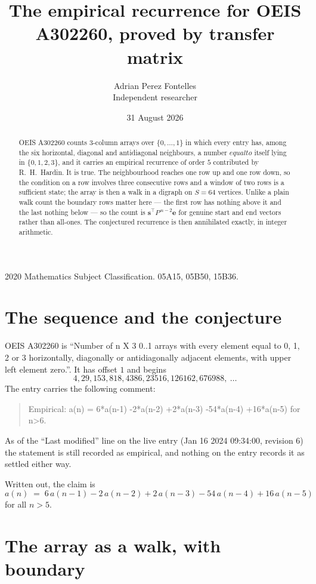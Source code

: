 \documentclass[11pt,a4paper]{article}
\title{The empirical recurrence for OEIS A302260, proved by transfer matrix}
\author{Adrian Perez Fontelles\\ \small Independent researcher}
\date{31 August 2026}
\theoremstyle{plain}
\theoremstyle{definition}
\begin{document}
\maketitle

\begin{abstract}
OEIS A302260 counts $3$-column arrays over $\{0,\dots,1\}$ in which every entry has,
among the six horizontal, diagonal and antidiagonal neighbours, a number $equal to$ itself lying in $\{0,1,2,3\}$, and it carries an empirical
recurrence of order $5$ contributed by R.~H.~Hardin. It is true. The neighbourhood
reaches one row up and one row down, so the condition on a row involves three consecutive
rows and a window of two rows is a sufficient state; the array is then a walk in a digraph
on $S=64$ vertices. Unlike a plain walk count the boundary rows matter here --- the first
row has nothing above it and the last nothing below --- so the count is
$\mathbf{s}^{\!\top}P^{\,n-2}\mathbf{e}$ for genuine start and end vectors rather than
all-ones. The conjectured recurrence is then annihilated exactly, in integer arithmetic.
\end{abstract}

\noindent\small 2020 Mathematics Subject Classification. 05A15, 05B50, 15B36.\normalsize

\section{The sequence and the conjecture}

OEIS A302260 is ``Number of n X 3 0..1 arrays with every element equal to 0, 1, 2 or 3 horizontally, diagonally or antidiagonally adjacent elements, with upper left element zero.''. It has offset
$1$ and begins
\[
4, 29, 153, 818, 4386, 23516, 126162, 676988,\ \dots
\]
The entry carries the following comment:
\begin{quote}\small
Empirical: a(n) = 6*a(n-1) -2*a(n-2) +2*a(n-3) -54*a(n-4) +16*a(n-5) for n>6.
\end{quote}
As of the ``Last modified'' line on the live entry (Jan 16 2024 09:34:00, revision
6) the statement is still recorded as empirical, and nothing on the entry
records it as settled either way.

Written out, the claim is
\begin{equation}\label{eq:conj}
a(n)\;=\;6\,a(n-1) - 2\,a(n-2) + 2\,a(n-3) - 54\,a(n-4) + 16\,a(n-5)
\end{equation}
for all $n>5$.

\section{The array as a walk, with boundary}
\end{document}
